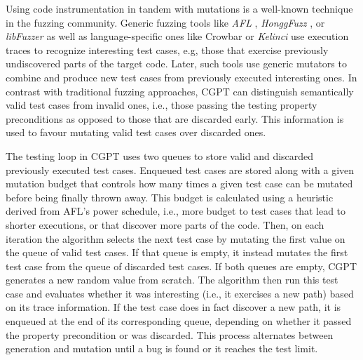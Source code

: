 \documentclass[sigconf,review,anonymous]{acmart}
\begin{document}
Using code instrumentation in tandem with mutations is a well-known technique in
the fuzzing community.
%
Generic fuzzing tools like \emph{AFL} \cite{afl}, \emph{HonggFuzz}
\cite{honggfuzz}, or \emph{libFuzzer} \citeyearpar{libfuzzer} as well as
language-specific ones like Crowbar \cite{dolan2017testing} or \emph{Kelinci}
\cite{kersten2017poster} use execution traces to recognize interesting test
cases, e.g, those that exercise previously undiscovered parts of the target
code.
%
Later, such tools use generic mutators to combine and produce new test cases
from previously executed interesting ones.
%
%
In contrast with traditional fuzzing approaches, CGPT can distinguish
semantically valid test cases from invalid ones, i.e., those passing the testing
property preconditions as opposed to those that are discarded early.
%
This information is used to favour mutating valid test cases over discarded
ones.


The testing loop in CGPT uses two queues to store valid and discarded previously
executed test cases.
%
Enqueued test cases are stored along with a given mutation budget that controls
how many times a given test case can be mutated before being finally thrown
away.
%
This budget is calculated using a heuristic derived from AFL's power schedule,
i.e., more budget to test cases that lead to shorter executions, or that
discover more parts of the code.
%
Then, on each iteration the algorithm selects the next test case by mutating the
first value on the queue of valid test cases.
%
If that queue is empty, it instead mutates the first test case from the queue of
discarded test cases.
%
If both queues are empty, CGPT generates a new random value from scratch.
%
The algorithm then run this test case and evaluates whether it was interesting
(i.e., it exercises a new path) based on its trace information.
%
If the test case does in fact discover a new path, it is enqueued at the end of
its corresponding queue, depending on whether it passed the property
precondition or was discarded.
%
%
This process alternates between generation and mutation until a bug is found or
it reaches the test limit.
\end{document}
